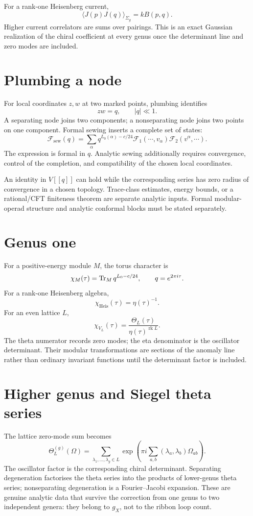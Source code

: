 For a rank-one Heisenberg current,
\[
 \langle J(p)J(q)\rangle_{\Sigma_g}=k B(p,q).
\]
Higher current correlators are sums over pairings.  This is an exact Gaussian realization of the chiral coefficient at every genus once the determinant line and zero modes are included.

\section{Plumbing a node}
For local coordinates \(z,w\) at two marked points, plumbing identifies
\[
 zw=q,
 \qquad |q|\ll1.
\]
A separating node joins two components; a nonseparating node joins two points on one component.  Formal sewing inserts a complete set of states:
\[
 \mathcal F_{\mathrm{sew}}(q)
 =\sum_\alpha q^{L_0(\alpha)-c/24}
 \mathcal F_1(\cdots,v_\alpha)
 \mathcal F_2(v^\alpha,\cdots).
\]
The expression is formal in \(q\).  Analytic sewing additionally requires convergence, control of the completion, and compatibility of the chosen local coordinates.

\begin{nogobox}[title={No-go theorem 22: formal sewing does not imply analytic convergence}]
An identity in \(V[[q]]\) can hold while the corresponding series has zero radius of convergence in a chosen topology.  Trace-class estimates, energy bounds, or a rational/CFT finiteness theorem are separate analytic inputs.  Formal modular-operad structure and analytic conformal blocks must be stated separately.
\end{nogobox}

\section{Genus one}
For a positive-energy module \(M\), the torus character is
\[
 \chi_M(\tau)=\operatorname{Tr}_M q^{L_0-c/24},
 \qquad q=e^{2\pi i\tau}.
\]
For a rank-one Heisenberg algebra,
\[
 \chi_{\mathrm{Heis}}(\tau)=\eta(\tau)^{-1}.
\]
For an even lattice \(L\),
\[
 \chi_{V_L}(\tau)=\frac{\Theta_L(\tau)}{\eta(\tau)^{\operatorname{rk}L}}.
\]
The theta numerator records zero modes; the eta denominator is the oscillator determinant.  Their modular transformations are sections of the anomaly line rather than ordinary invariant functions until the determinant factor is included.

\section{Higher genus and Siegel theta series}
The lattice zero-mode sum becomes
\[
 \Theta_L^{(g)}(\Omega)
 =\sum_{\lambda_1,\ldots,\lambda_g\in L}
 \exp\left(\pi i\sum_{a,b}(\lambda_a,\lambda_b)\Omega_{ab}\right).
\]
The oscillator factor is the corresponding chiral determinant.  Separating degeneration factorises the theta series into the products of lower-genus theta series; nonseparating degeneration is a Fourier--Jacobi expansion.  These are genuine analytic data that survive the correction from one genus to two independent genera: they belong to \(g_X\), not to the ribbon loop count.

